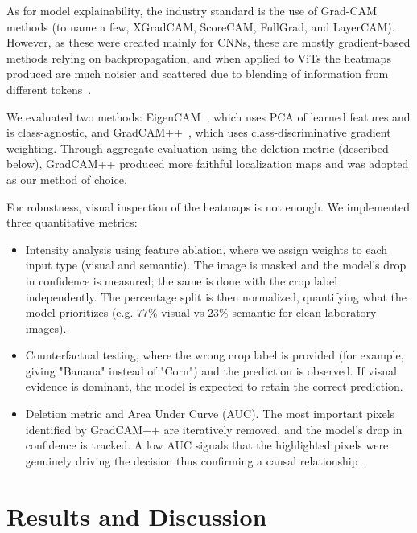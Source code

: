 \documentclass{bmvc2k}
\begin{document}
As for model explainability, the industry standard is the use of Grad-CAM methods (to name a few, XGradCAM, ScoreCAM, FullGrad, and LayerCAM). However, as these were created mainly for CNNs, these are mostly gradient-based methods relying on backpropagation, and when applied to ViTs the heatmaps produced are much noisier and scattered due to blending of information from different tokens~\cite{abnar2020quantifying}.

We evaluated two methods: EigenCAM~\cite{bany2020}, which uses PCA of learned features and is class-agnostic, and GradCAM++~\cite{chattopadhay2018}, which uses class-discriminative gradient weighting. Through aggregate evaluation using the deletion metric (described below), GradCAM++ produced more faithful localization maps and was adopted as our method of choice.

For robustness, visual inspection of the heatmaps is not enough. We implemented three quantitative metrics:

\begin{itemize}
    \item Intensity analysis using feature ablation, where we assign weights to each input type (visual and semantic). The image is masked and the model's drop in confidence is measured; the same is done with the crop label independently. The percentage split is then normalized, quantifying what the model prioritizes (e.g. $77\%$ visual vs $23\%$ semantic for clean laboratory images).

    \item Counterfactual testing, where the wrong crop label is provided (for example, giving "Banana" instead of "Corn") and the prediction is observed. If visual evidence is dominant, the model is expected to retain the correct prediction.

    \item Deletion metric and Area Under Curve (AUC). The most important pixels identified by GradCAM++ are iteratively removed, and the model's drop in confidence is tracked. A low AUC signals that the highlighted pixels were genuinely driving the decision thus confirming a causal relationship~\cite{petsiuk2018rise}.
\end{itemize}

\section{Results and Discussion}
\label{sec:results}
\end{document}
